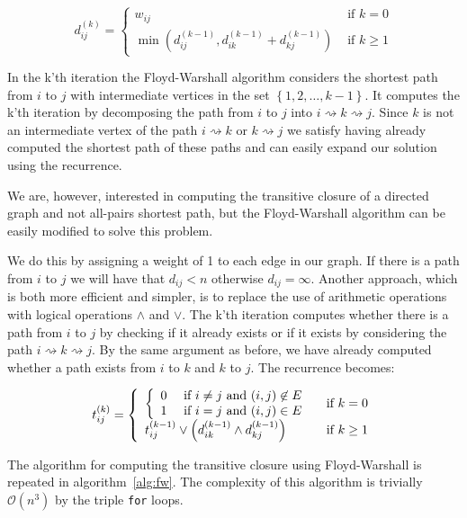 \documentclass[a4paper,oneside,article,11pt]{memoir}
\begin{document}
$$
d_{ij}^{(k)} = \left\{ \begin{array}{ll}
w_{ij} &\mbox{ if $k=0$} \\
\min\left(d_{ij}^{(k-1)}, d_{ik}^{(k-1)} + d_{kj}^{(k-1)}\right) &\mbox{ if $k \geq 1$}
\end{array} \right.
$$

In the k'th iteration the Floyd-Warshall algorithm considers the shortest path from $i$ to $j$ with intermediate vertices in the set $\left\lbrace 1,2,\dots,k-1\right\rbrace$. It computes the k'th iteration by decomposing the path from $i$ to $j$ into $i \rightsquigarrow k \rightsquigarrow j$. Since $k$ is not an intermediate vertex of the path $i\rightsquigarrow k$ or $k\rightsquigarrow j$ we satisfy having already computed the shortest path of these paths and can easily expand our solution using the recurrence.

We are, however, interested in computing the transitive closure of a directed graph and not all-pairs shortest path, but the Floyd-Warshall algorithm can be easily modified to solve this problem.

We do this by assigning a weight of 1 to each edge in our graph. If there is a path from $i$ to $j$ we will have that $d_{ij} < n$ otherwise $d_{ij} = \infty$. Another approach, which is both more efficient and simpler, is to replace the use of arithmetic operations with logical operations $\wedge$ and $\vee$. The k'th iteration computes whether there is a path from $i$ to $j$ by checking if it already exists or if it exists by considering the path $i\rightsquigarrow k\rightsquigarrow j$. By the same argument as before, we have already computed whether a path exists from $i$ to $k$ and $k$ to $j$. The recurrence becomes:

$$
t_{ij}^{(k)} = \left\{ \begin{array}{ll}
\left\{
\begin{array}{ll}
0 &\mbox{ if $i \neq j $ and $ (i,j)\not\in E$} \\
1 &\mbox{ if $i = j $ and $ (i,j)\in E$}
\end{array} 
\right.
&\mbox{ if $k=0$} \\
t_{ij}^{(k-1)} \vee \left(d_{ik}^{(k-1)} \wedge d_{kj}^{(k-1)}\right) &\mbox{ if $k \geq 1$}
\end{array} \right.
$$

The algorithm for computing the transitive closure using Floyd-Warshall is repeated in algorithm~\ref{alg:fw}. The complexity of this algorithm is trivially $\mathcal{O}(n^3)$ by the triple \texttt{for} loops.
\end{document}
